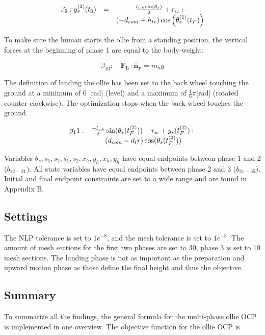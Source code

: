 \documentclass[default,iicol]{sn-jnl}
\begin{document}
{\begin{equation}
\begin{array}{l c c}
\beta_9: y_s^{(2)}(t_0) & = & \frac{l_{w b} \sin \left(\theta_s\right)}{2}+r_w+ \\ 
& & \left(-d_{c o m}+h_{t r}\right) \cos \left(\theta_s^{(1)}(t_F)\right)
\end{array}
\end{equation}

To make sure the human starts the ollie from a standing position, the vertical forces at the beginning of phase 1 are equal to the body-weight:

\begin{equation}
    \beta_10: \quad \mathbf{F_h} \cdot \mathbf{\hat n_y} = m_h g
\end{equation}

The definition of landing the ollie has been set to the back wheel touching the ground at a minimum of 0 [rad] (level) and a maximum of $\frac{1}{6} \pi$[rad] (rotated counter clockwise). The optimization stops when the back wheel touches the ground.

\begin{equation}
\begin{array}{l c}
\beta_11 : & \frac{-l_{wb}}{2} \sin(\theta_s(t_F^{(2)})) - r_w + y_s(t_F^{(2)}) + \\ 
& (d_{com} - {d_tr}) \cos(\theta_s(t_F^{(2)}))
\end{array}
\end{equation}

Variables $\theta_s, s_1, s_2, \dot s_1, \dot s_2, x_h, y_h, \dot x_h, \dot y_h$ have equal endpoints between phase 1 and 2 ($b_{12-21})$. All state variables have equal endpoints between phase 2 and 3 ($b_{21-35}$). Initial and final endpoint constraints are set to a wide range and are found in Appendix B.

\subsection{Settings}\label{s_settings}
The NLP tolerance is set to $1e^{-8}$, and the mesh tolerance is set to $1e^{-3}$. The amount of mesh sections for the first two phases are set to 30, phase 3 is set to 10 mesh sections. The landing phase is not as important as the preparation and upward motion phase as those define the final height and thus the objective.

\subsection{Summary}\label{s_summary}
To summarize all the findings, the general formula for the multi-phase ollie OCP is implemented in one overview. The objective function for the ollie OCP is 

}
\end{document}
